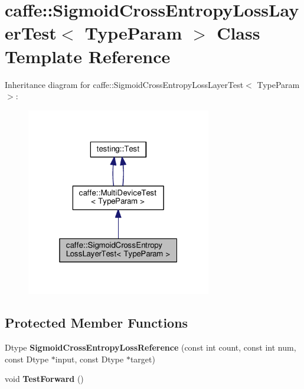 \hypertarget{classcaffe_1_1_sigmoid_cross_entropy_loss_layer_test}{}\section{caffe\+:\+:Sigmoid\+Cross\+Entropy\+Loss\+Layer\+Test$<$ Type\+Param $>$ Class Template Reference}
\label{classcaffe_1_1_sigmoid_cross_entropy_loss_layer_test}


Inheritance diagram for caffe\+:\+:Sigmoid\+Cross\+Entropy\+Loss\+Layer\+Test$<$ Type\+Param $>$\+:
\nopagebreak
\begin{figure}[H]
\begin{center}
\leavevmode
\includegraphics[width=229pt]{classcaffe_1_1_sigmoid_cross_entropy_loss_layer_test__inherit__graph}
\end{center}
\end{figure}
\subsection*{Protected Member Functions}
\begin{DoxyCompactItemize}
\item 
\mbox{\label{classcaffe_1_1_sigmoid_cross_entropy_loss_layer_test_a1590f4cdc74bb11989df3b10c2e8893d}} 
Dtype {\bfseries Sigmoid\+Cross\+Entropy\+Loss\+Reference} (const int count, const int num, const Dtype $\ast$input, const Dtype $\ast$target)
\item 
\mbox{\label{classcaffe_1_1_sigmoid_cross_entropy_loss_layer_test_a52d0f16c2d838ca50dbc054710b1d5ba}} 
void {\bfseries Test\+Forward} ()
\end{DoxyCompactItemize}
